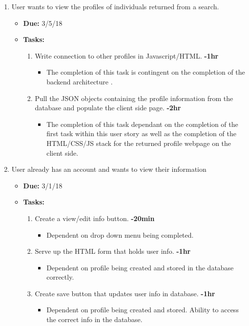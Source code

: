 \documentclass[12pt]{article}
\begin{document}
\begin{enumerate}
    \item User wants to view the profiles of individuals returned from a search.
      \begin{itemize}
        \item \textbf{Due:}  3/5/18
        \item \textbf{Tasks:}
          \begin{enumerate}
            \item Write connection to other profiles in Javascript/HTML. \textbf{-1hr}
              \begin{itemize}
                \item The completion of this task is contingent on the completion of the backend architecture .
              \end{itemize}
            \item Pull the JSON objects containing the profile information from the database and populate the client side page. \textbf{-2hr}
              \begin{itemize}
                \item The completion of this task dependant on the completion of the first task within this user story as well as the completion of the HTML/CSS/JS stack for the returned profile webpage on the client side.
              \end{itemize}
          \end{enumerate}
      \end{itemize}

    \item User already has an account and wants to view their information
      \begin{itemize}
        \item \textbf{Due:} 3/1/18
        \item \textbf{Tasks:}
          \begin{enumerate}
            \item Create a view/edit info button. \textbf{-20min}
              \begin{itemize}
                \item Dependent on drop down menu being completed.
              \end{itemize}
            \item Serve up the HTML form that holds user info. \textbf{-1hr}
              \begin{itemize}
                \item Dependent on profile being created and stored in the database correctly.
              \end{itemize}
            \item Create save button that updates user info in database. \textbf{-1hr}
              \begin{itemize}
                \item Dependent on profile being created and stored. Ability to access the correct info in the database.
              \end{itemize}
          \end{enumerate}
      \end{itemize}


\end{enumerate}
\end{document}
